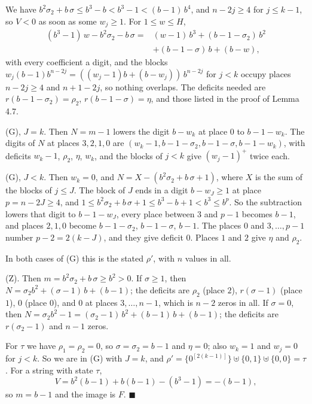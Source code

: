 \documentclass[11pt,letterpaper]{article}
\theoremstyle{paperstyle}
\theoremstyle{paperstyledef}
\theoremstyle{paperstylerem}
\begin{document}
We have \(b^2 \sigma_2 + b\,\sigma \leq b^3 - b < b^3 - 1 < (b-1)\, b^4\), and \(n - 2j \geq 4\) for \(j \leq k-1\), so \(V < 0\) as soon as some \(w_j \geq 1\). For \(1 \leq w \leq H\), \[\begin{aligned}(b^3 - 1)\, w - b^2 \sigma_2 - b\,\sigma = {} & (w-1)\, b^3 + (b-1-\sigma_2)\, b^2 \\ & + (b-1-\sigma)\, b + (b-w),\end{aligned}\] with every coefficient a digit, and the blocks \(w_j (b-1) b^{n-2j} = ((w_j - 1) b + (b - w_j))\, b^{n-2j}\) for \(j < k\) occupy places \(n-2j \geq 4\) and \(n+1-2j\), so nothing overlaps. The deficits needed are \(r(b-1-\sigma_2) = \rho_2\), \(r(b-1-\sigma) = \eta\), and those listed in the proof of Lemma 4.7.

(G), \(J = k\). Then \(N = m - 1\) lowers the digit \(b - w_k\) at place \(0\) to \(b-1-w_k\). The digits of \(N\) at places \(3, 2, 1, 0\) are \((w_k - 1, b-1-\sigma_2, b-1-\sigma, b-1-w_k)\), with deficits \(w_k - 1\), \(\rho_2\), \(\eta\), \(w_k\), and the blocks of \(j < k\) give \((w_j - 1)^+\) twice each.

(G), \(J < k\). Then \(w_k = 0\), and \(N = X - (b^2 \sigma_2 + b\,\sigma + 1)\), where \(X\) is the sum of the blocks of \(j \leq J\). The block of \(J\) ends in a digit \(b - w_J \geq 1\) at place \(p = n - 2J \geq 4\), and \(1 \leq b^2 \sigma_2 + b\,\sigma + 1 \leq b^3 - b + 1 < b^3 \leq b^p\). So the subtraction lowers that digit to \(b-1-w_J\), every place between \(3\) and \(p-1\) becomes \(b-1\), and places \(2, 1, 0\) become \(b-1-\sigma_2\), \(b-1-\sigma\), \(b-1\). The places \(0\) and \(3, \dots, p-1\) number \(p - 2 = 2(k-J)\), and they give deficit \(0\). Places \(1\) and \(2\) give \(\eta\) and \(\rho_2\).

In both cases of (G) this is the stated \(\rho'\), with \(n\) values in all.

(Z). Then \(m = b^2 \sigma_2 + b\,\sigma \geq b^2 > 0\). If \(\sigma \geq 1\), then \(N = \sigma_2 b^2 + (\sigma - 1)\, b + (b-1)\); the deficits are \(\rho_2\) (place \(2\)), \(r(\sigma - 1)\) (place \(1\)), \(0\) (place \(0\)), and \(0\) at places \(3, \dots, n-1\), which is \(n-2\) zeros in all. If \(\sigma = 0\), then \(N = \sigma_2 b^2 - 1 = (\sigma_2 - 1)\, b^2 + (b-1)\, b + (b-1)\); the deficits are \(r(\sigma_2 - 1)\) and \(n-1\) zeros.

For \(\tau\) we have \(\rho_1 = \rho_2 = 0\), so \(\sigma = \sigma_2 = b-1\) and \(\eta = 0\); also \(w_k = 1\) and \(w_j = 0\) for \(j < k\). So we are in (G) with \(J = k\), and \(\rho' = \{0^{[2(k-1)]}\} \uplus \{0, 1\} \uplus \{0, 0\} = \tau\). For a string with state \(\tau\), \[V = b^2(b-1) + b(b-1) - (b^3 - 1) = -(b-1),\] so \(m = b-1\) and the image is \(F\). \(\blacksquare\)
\end{document}

